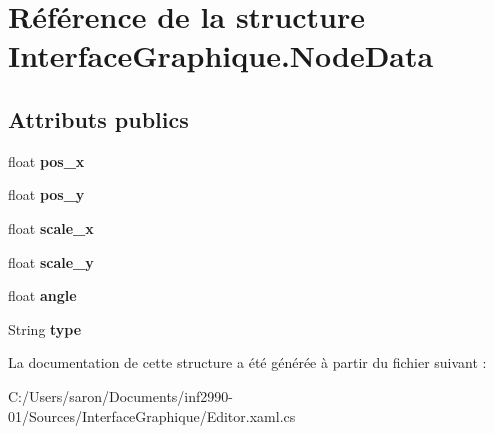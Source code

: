 \hypertarget{struct_interface_graphique_1_1_node_data}{\section{Référence de la structure Interface\-Graphique.\-Node\-Data}
\label{struct_interface_graphique_1_1_node_data}
}
\subsection*{Attributs publics}
\begin{DoxyCompactItemize}
\item 
\hypertarget{struct_interface_graphique_1_1_node_data_aa65b000f8aca6ca4ef06867dece673bc}{float {\bfseries pos\-\_\-x}}\label{struct_interface_graphique_1_1_node_data_aa65b000f8aca6ca4ef06867dece673bc}

\item 
\hypertarget{struct_interface_graphique_1_1_node_data_a9f8a6932e2af21e5c9de9ca0da1b10d5}{float {\bfseries pos\-\_\-y}}\label{struct_interface_graphique_1_1_node_data_a9f8a6932e2af21e5c9de9ca0da1b10d5}

\item 
\hypertarget{struct_interface_graphique_1_1_node_data_af70290d20df57f31d3836eb0d43849f8}{float {\bfseries scale\-\_\-x}}\label{struct_interface_graphique_1_1_node_data_af70290d20df57f31d3836eb0d43849f8}

\item 
\hypertarget{struct_interface_graphique_1_1_node_data_a40c67aeb78481a26523814f70e839ddd}{float {\bfseries scale\-\_\-y}}\label{struct_interface_graphique_1_1_node_data_a40c67aeb78481a26523814f70e839ddd}

\item 
\hypertarget{struct_interface_graphique_1_1_node_data_a667c8cab7e202742610cb8ce22ad1e45}{float {\bfseries angle}}\label{struct_interface_graphique_1_1_node_data_a667c8cab7e202742610cb8ce22ad1e45}

\item 
\hypertarget{struct_interface_graphique_1_1_node_data_adf70f17797f2ab0d097d6462b959e823}{String {\bfseries type}}\label{struct_interface_graphique_1_1_node_data_adf70f17797f2ab0d097d6462b959e823}

\end{DoxyCompactItemize}


La documentation de cette structure a été générée à partir du fichier suivant \-:\begin{DoxyCompactItemize}
\item 
C\-:/\-Users/saron/\-Documents/inf2990-\/01/\-Sources/\-Interface\-Graphique/Editor.\-xaml.\-cs\end{DoxyCompactItemize}
